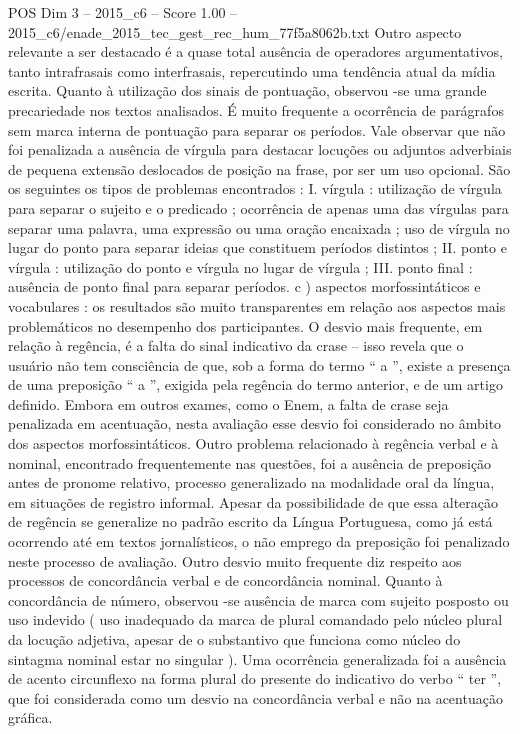 \begin{textsample}{POS Dim 3 – 2015\_c6 – Score 1.00 – 2015\_c6/enade\_2015\_tec\_gest\_rec\_hum\_77f5a8062b.txt}
Outro aspecto relevante a ser destacado é a quase total ausência de operadores argumentativos, tanto intrafrasais como interfrasais, repercutindo uma tendência atual da mídia escrita.
Quanto à utilização dos sinais de pontuação, observou -se uma grande precariedade nos textos analisados.
É muito frequente a ocorrência de parágrafos sem marca interna de pontuação para separar os períodos.
Vale observar que não foi penalizada a ausência de vírgula para destacar locuções ou adjuntos adverbiais de pequena extensão deslocados de posição na frase, por ser um uso opcional.
São os seguintes os tipos de problemas encontrados : I. vírgula : utilização de vírgula para separar o sujeito e o predicado ; ocorrência de apenas uma das vírgulas para separar uma palavra, uma expressão ou uma oração encaixada ; uso de vírgula no lugar do ponto para separar ideias que constituem períodos distintos ; II. ponto e vírgula : utilização do ponto e vírgula no lugar de vírgula ; III. ponto final : ausência de ponto final para separar períodos. c ) aspectos morfossintáticos e vocabulares : os resultados são muito transparentes em relação aos aspectos mais problemáticos no desempenho dos participantes.
O desvio mais frequente, em relação à regência, é a falta do sinal indicativo da crase – isso revela que o usuário não tem consciência de que, sob a forma do termo “ a ”, existe a presença de uma preposição “ a ”, exigida pela regência do termo anterior, e de um artigo definido.
Embora em outros exames, como o Enem, a falta de crase seja penalizada em acentuação, nesta avaliação esse desvio foi considerado no âmbito dos aspectos morfossintáticos.
Outro problema relacionado à regência verbal e à nominal, encontrado frequentemente nas questões, foi a ausência de preposição antes de pronome relativo, processo generalizado na modalidade oral da língua, em situações de registro informal.
Apesar da possibilidade de que essa alteração de regência se generalize no padrão escrito da Língua Portuguesa, como já está ocorrendo até em textos jornalísticos, o não emprego da preposição foi penalizado neste processo de avaliação.
Outro desvio muito frequente diz respeito aos processos de concordância verbal e de concordância nominal.
Quanto à concordância de número, observou -se ausência de marca com sujeito posposto ou uso indevido ( uso inadequado da marca de plural comandado pelo núcleo plural da locução adjetiva, apesar de o substantivo que funciona como núcleo do sintagma nominal estar no singular ).
Uma ocorrência generalizada foi a ausência de acento circunflexo na forma plural do presente do indicativo do verbo “ ter ”, que foi considerada como um desvio na concordância verbal e não na acentuação gráfica.

\end{textsample}

